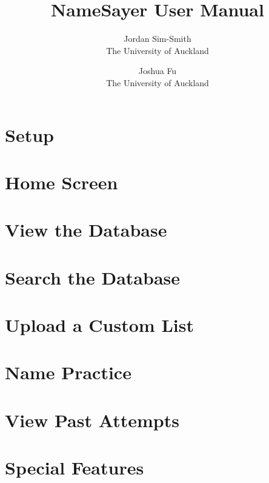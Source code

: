 \documentclass{article}
\begin{document}
\title{NameSayer User Manual}
\author{Jordan Sim-Smith \\
		The University of Auckland \\
		\and 
		Joshua Fu \\
		The University of Auckland \\
		}

\maketitle

\clearpage

\tableofcontents

\clearpage

\section{Setup}

\section{Home Screen}

\section{View the Database}

\section{Search the Database}

\section{Upload a Custom List}

\section{Name Practice}

\section{View Past Attempts}

\section{Special Features}
\end{document}

